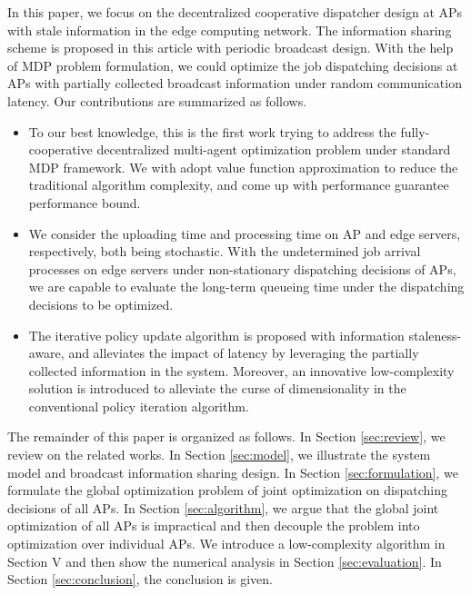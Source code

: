 In this paper, we focus on the decentralized cooperative dispatcher design at APs with stale information in the edge computing network.
The information sharing scheme is proposed in this article with periodic broadcast design.
With the help of MDP problem formulation, we could optimize the job dispatching decisions at APs with partially collected broadcast information under random communication latency.
Our contributions are summarized as follows.
\begin{itemize}
    \item To our best knowledge, this is the first work trying to address the fully-cooperative decentralized multi-agent optimization problem under standard MDP framework.
    We with adopt value function approximation to reduce the traditional algorithm complexity, and come up with performance guarantee performance bound.

    \item We consider the uploading time and processing time on AP and edge servers, respectively, both being stochastic.
    With the undetermined job arrival processes on edge servers under non-stationary dispatching decisions of APs, we are capable to evaluate the long-term queueing time under the dispatching decisions to be optimized.

    \item The iterative policy update algorithm is proposed with information staleness-aware, and alleviates the impact of latency by leveraging the partially collected information in the system.
    Moreover, an innovative low-complexity solution is introduced to alleviate the curse of dimensionality in the conventional policy iteration algorithm.
\end{itemize}

The remainder of this paper is organized as follows.
In Section \ref{sec:review}, we review on the related works.
In Section \ref{sec:model}, we illustrate the system model and broadcast information sharing design.
In Section \ref{sec:formulation}, we formulate the global optimization problem of joint optimization on dispatching decisions of all APs.
In Section \ref{sec:algorithm}, we argue that the global joint optimization of all APs is impractical and then decouple the problem into optimization over individual APs.
We introduce a low-complexity algorithm in Section V and then show the numerical analysis in Section \ref{sec:evaluation}.
In Section \ref{sec:conclusion}, the conclusion is given.

